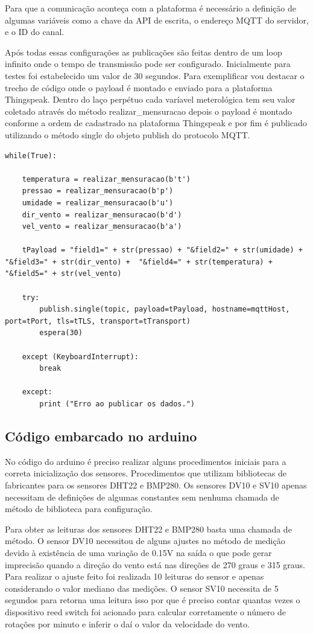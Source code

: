 Para que a comunicação aconteça com a plataforma é necessário a definição de algumas variáveis como a chave da API de escrita, o endereço MQTT do servidor, e o ID do canal.

Após todas essas configurações as publicações são feitas dentro de um loop infinito onde o tempo de transmissão pode ser configurado. Inicialmente para testes foi estabelecido um valor de 30 segundos. Para exemplificar vou destacar o trecho de código onde o payload é montado e enviado para a plataforma Thingspeak. Dentro do laço perpétuo cada varíavel meterológica tem seu valor coletado através do método realizar\_mensuracao depois o payload é montado conforme a ordem de cadastrado na plataforma Thingspeak e por fim é publicado utilizando o método single do objeto publish do protocolo MQTT. 

\begin{lstlisting}
while(True):

    temperatura = realizar_mensuracao(b't')
    pressao = realizar_mensuracao(b'p')
    umidade = realizar_mensuracao(b'u')
    dir_vento = realizar_mensuracao(b'd')
    vel_vento = realizar_mensuracao(b'a')
    
    tPayload = "field1=" + str(pressao) + "&field2=" + str(umidade) + "&field3=" + str(dir_vento) +  "&field4=" + str(temperatura) +  "&field5=" + str(vel_vento)

    try:
        publish.single(topic, payload=tPayload, hostname=mqttHost, port=tPort, tls=tTLS, transport=tTransport)
        espera(30)

    except (KeyboardInterrupt):
        break

    except:
        print ("Erro ao publicar os dados.") \end{lstlisting}

\subsection{Código embarcado no arduino}

No código do arduino é preciso realizar alguns procedimentos iniciais para a correta inicialização dos sensores. Procedimentos que utilizam bibliotecas de fabricantes para os sensores DHT22 e BMP280. Os sensores DV10 e SV10 apenas necessitam de definições de algumas constantes sem nenhuma chamada de método de biblioteca para configuração.

Para obter as leituras dos sensores DHT22 e BMP280 basta uma chamada de método. O sensor DV10 necessitou de alguns ajustes no método de medição devido à existência de uma variação de 0.15V na saída o que pode gerar imprecisão quando a direção do vento está nas direções de 270 graus e 315 graus. Para realizar o ajuste feito foi realizada 10 leituras do sensor e apenas considerando o valor mediano das medições. O sensor SV10 necessita de 5 segundos para retorna uma leitura isso por que é preciso contar quantas vezes o dispositivo reed switch foi acionado para calcular corretamente o número de rotações por minuto e inferir o daí o valor da velocidade do vento.

